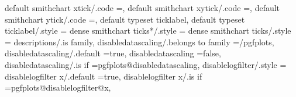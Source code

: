 {{{{{{{{{{{{{{{{{{{{{{{{{default smithchart xtick/.code                                     =,                                                                                                                                  
default smithchart xytick/.code                                    =,                                                                                                                                  
default smithchart ytick/.code                                     =,                                                                                                                                  
default typeset ticklabel,
default typeset ticklabel/.style                                   ={                                                                                                                                  
dense smithchart ticks*/.style                                     ={                                                                                                                                  
dense smithchart ticks/.style                                      ={                                                                                                                                  
descriptions/.is family,
disabledatascaling/.belongs to family                              =/pgfplots,                                                                                                                         
disabledatascaling/.default                                        =true,                                                                                                                              
disabledatascaling                                                 =false,                                                                                                                             
disabledatascaling/.is if                                          =pgfplots@disabledatascaling,                                                                                                       
disablelogfilter/.style                                            ={                                                                                                                                  
disablelogfilter x/.default                                        =true,                                                                                                                              
disablelogfilter x/.is if                                          =pgfplots@disablelogfilter@x,                                                                                                       
}}}}}}}}}}}}}}}}}}}}}}}}}}}}}
